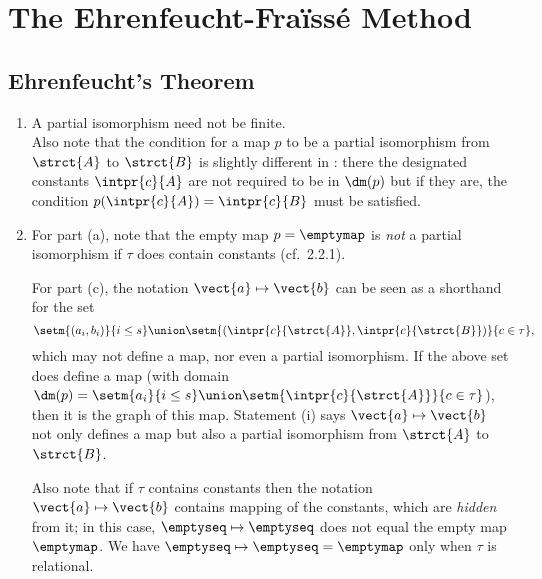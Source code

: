 \setcounter{chapter}{1}
\chapter{The Ehrenfeucht-Fra\"{i}ss\'{e} Method}
\setcounter{section}{1}
\section{Ehrenfeucht's Theorem}
\begin{enumerate}[1.]
%
\item {} A partial isomorphism need not be finite.
\medskip\\
Also note that the condition for a map $p$ to be a partial isomorphism from $\strct{A}$ to $\strct{B}$ is slightly different in \cite{EFT}: there the designated constants $\intpr{c}{A}$ are not required to be in $\dm(p)$ but if they are, the condition $p(\intpr{c}{A}) = \intpr{c}{B}$ must be satisfied.
%
\item {} For part (a), note that the empty map $p = \emptymap$ is \emph{not} a partial isomorphism if $\tau$ does contain constants (cf.\ 2.2.1).

For part (c), the notation $\vect{a} \mapsto \vect{b}$ can be seen as a shorthand for the set
\[
\setm{(a_i, b_i)}{i \leq s} \union \setm{(\intpr{c}{\strct{A}}, \intpr{c}{\strct{B}})}{c \in \tau},
\]
which may not define a map, nor even a partial isomorphism. If the above set does define a map (with domain $\dm(p) = \setm{a_i}{i \leq s} \union \setm{\intpr{c}{\strct{A}}}{c \in \tau}$), then it is the graph of this map. Statement (i) says $\vect{a} \mapsto \vect{b}$ not only defines a map but also a partial isomorphism from $\strct{A}$ to $\strct{B}$.

Also note that if $\tau$ contains constants then the notation $\vect{a} \mapsto \vect{b}$ contains mapping of the constants, which are \emph{hidden} from it; in this case, $\emptyseq \mapsto \emptyseq$ does not equal the empty map $\emptymap$. We have $\emptyseq \mapsto \emptyseq = \emptymap$ only when $\tau$ is relational.


\end{enumerate}
